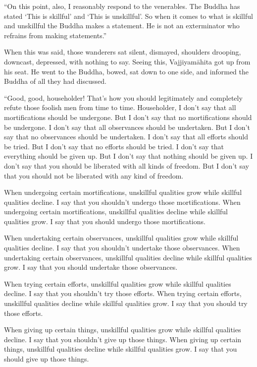 \documentclass[12pt,openany]{book}%
\begin{document}
“On this point, also, I reasonably respond to the venerables. The Buddha has stated ‘This is skillful’ and ‘This is unskillful’. So when it comes to what is skillful and unskillful the Buddha makes a statement. He is not an exterminator who refrains from making statements.” 

When this was said, those wanderers sat silent, dismayed, shoulders drooping, downcast, depressed, with nothing to say. Seeing this, \textsanskrit{Vajjiyamāhita} got up from his seat. He went to the Buddha, bowed, sat down to one side, and informed the Buddha of all they had discussed. 

“Good, good, householder! That’s how you should legitimately and completely refute those foolish men from time to time. Householder, I don’t say that all mortifications should be undergone. But I don’t say that no mortifications should be undergone. I don’t say that all observances should be undertaken. But I don’t say that no observances should be undertaken. I don’t say that all efforts should be tried. But I don’t say that no efforts should be tried. I don’t say that everything should be given up. But I don’t say that nothing should be given up. I don’t say that you should be liberated with all kinds of freedom. But I don’t say that you should not be liberated with any kind of freedom. 

When undergoing certain mortifications, unskillful qualities grow while skillful qualities decline. I say that you shouldn’t undergo those mortifications. When undergoing certain mortifications, unskillful qualities decline while skillful qualities grow. I say that you should undergo those mortifications. 

When undertaking certain observances, unskillful qualities grow while skillful qualities decline. I say that you shouldn’t undertake those observances. When undertaking certain observances, unskillful qualities decline while skillful qualities grow. I say that you should undertake those observances. 

When trying certain efforts, unskillful qualities grow while skillful qualities decline. I say that you shouldn’t try those efforts. When trying certain efforts, unskillful qualities decline while skillful qualities grow. I say that you should try those efforts. 

When giving up certain things, unskillful qualities grow while skillful qualities decline. I say that you shouldn’t give up those things. When giving up certain things, unskillful qualities decline while skillful qualities grow. I say that you should give up those things. 
\end{document}
